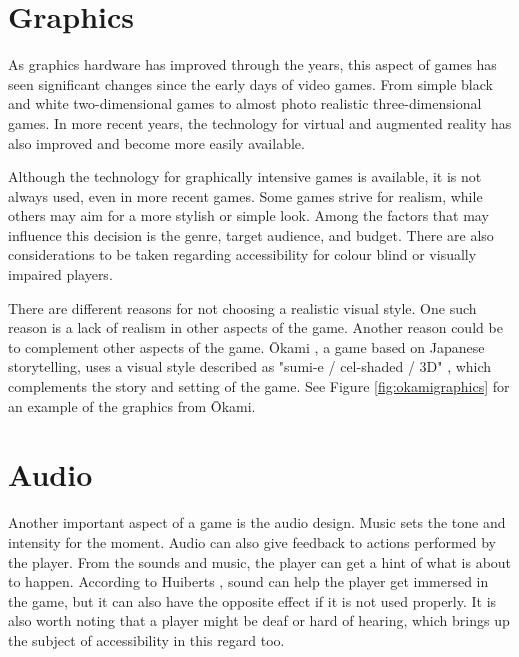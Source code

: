 \section{Graphics}
\label{immersionGraphics}
As graphics hardware has improved through the years, this aspect of games has seen significant changes since the early days of video games.
From simple black and white two-dimensional games to almost photo realistic three-dimensional games.
In more recent years, the technology for virtual and augmented reality has also improved and become more easily available.

Although the technology for graphically intensive games is available, it is not always used, even in more recent games.
Some games strive for realism, while others may aim for a more stylish or simple look.
Among the factors that may influence this decision is the genre, target audience, and budget.
There are also considerations to be taken regarding accessibility for colour blind or visually impaired players.

There are different reasons for not choosing a realistic visual style.
One such reason is a lack of realism in other aspects of the game.
Another reason could be to complement other aspects of the game.
\={O}kami \cite{okami2006}, a game based on Japanese storytelling, uses a visual style described as "sumi-e / cel-shaded / 3D" \cite{donovan2013pretty}, which complements the story and setting of the game.
See Figure \ref{fig:okamigraphics} for an example of the graphics from \={O}kami.



\section{Audio}
\label{immersionAudio}

Another important aspect of a game is the audio design.
Music sets the tone and intensity for the moment.
Audio can also give feedback to actions performed by the player.
From the sounds and music, the player can get a hint of what is about to happen.
According to Huiberts \cite{huiberts2010captivating}, sound can help the player get immersed in the game, but it can also have the opposite effect if it is not used properly.
It is also worth noting that a player might be deaf or hard of hearing, which brings up the subject of accessibility in this regard too.

